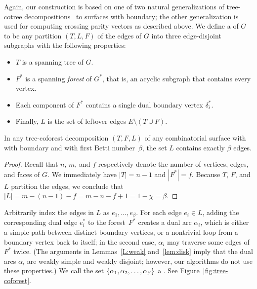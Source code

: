 \documentclass[letterpaper,review]{siamart190516}
\def\dualarc{\alpha}
\begin{document}
Again, our construction is based on one of two natural generalizations of tree-cotree
decompositions~\cite{e-dgteg-03} to surfaces with boundary; the other generalization is used for
computing crossing parity vectors as described above.
We define a  of $G$ to be any partition $(T, L, F)$ of the edges of $G$ into three edge-disjoint subgraphs with the following properties:
\begin{itemize}\itemsep0pt
\item $T$ is a spanning tree of $G$.
\item $F^*$ is a spanning \emph{forest} of $G^*$, that is, an acyclic subgraph that contains every vertex.
\item Each component of $F^*$ contains a single dual boundary vertex $\delta_i^*$.
\item Finally, $L$ is the set of leftover edges $E \setminus (T\cup F)$.
\end{itemize}
%
\begin{lemma}
\label{lem:L_edges_tree_coforest}
In any tree-coforest decomposition $(T, F, L)$ of any combinatorial surface with with boundary and with first Betti number~$\beta$, the set $L$ contains exactly $\beta$ edges.
\end{lemma}

\begin{proof}
Recall that $n$, $m$, and $f$ respectively denote the number of vertices, edges, and faces of $G$.
We immediately have $|T| = n-1$ and $|F^*| = f$.  Because $T$, $F$, and $L$ partition the edges, we conclude that $|L| = m - (n-1) - f = m - n - f + 1 = 1 - \chi  = \beta$.
\end{proof}

Arbitrarily index the edges in $L$ as $e_1, \dots, e_\beta$.  For each edge $e_i\in L$, adding the corresponding dual edge $e_i^*$ to the forest~$F^*$ creates a dual arc $\dualarc_i$, which is either a simple path between distinct boundary vertices, or a nontrivial loop from a boundary vertex back to itself; in the second case, $\dualarc_i$ may traverse some edges of $F^*$ twice.  (The arguments in Lemmas~\ref{L:weak} and~\ref{lem:disk} imply that the dual arcs $\dualarc_i$ are weakly simple and weakly disjoint; however, our algorithms do not use these properties.)
We call the set $\set{\dualarc_1, \dualarc_2, \dots, \dualarc_\beta}$ a .  See Figure~\ref{fig:tree-coforest}.  
\end{document}
